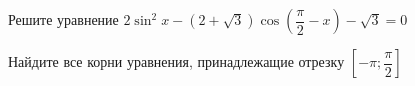 \begin{ex}
	\begin{condition}
		\begin{enumcols}[label=\asbuk*)]
			\item Решите уравнение \( 2\sin^2 x -\left(2+\sqrt{3}\right)\cos{\left(\dfrac{\pi}{2}-x\right)}  - \sqrt{3}= 0 \)
			\item Найдите все корни уравнения, принадлежащие отрезку \( \left[-\pi;\dfrac{\pi}{2}\right]  \)
		\end{enumcols}
	\end{condition}
\end{ex}